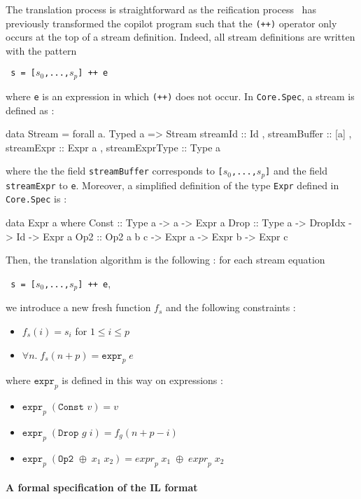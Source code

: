 The translation process is straightforward as the reification process~\cite{} has previously transformed the copilot program such that the \texttt{(++)} operator only occurs at the top of a stream definition. Indeed, all stream definitions are written with the pattern
\begin{center}\texttt{ s = [$s_0$,...,$s_p$] ++ e}\end{center}
where \texttt{e} is an expression in which \texttt{(++)} does not occur. In \texttt{Core.Spec}, a stream is defined as :
\begin{code}
data Stream = forall a. Typed a => Stream
  { streamId         :: Id
  , streamBuffer     :: [a]
  , streamExpr       :: Expr a
  , streamExprType   :: Type a }
\end{code}
where the the field \texttt{streamBuffer} corresponds to \texttt{[$s_0$,...,$s_p$]} and the field \texttt{streamExpr} to \texttt{e}. Moreover, a simplified definition of the type \texttt{Expr} defined in \texttt{Core.Spec} is :
\begin{code}
data Expr a where
  Const  :: Type a -> a -> Expr a
  Drop   :: Type a -> DropIdx -> Id -> Expr a
  Op2    :: Op2 a b c -> Expr a -> Expr b -> Expr c
\end{code}
Then, the translation algorithm is the following : for each stream equation \begin{center}\texttt{ s = [$s_0$,...,$s_p$] ++ e},\end{center}we introduce a new fresh function $f_s$ and the following constraints :

\begin{itemize}
\item $f_s(i) = s_i$ \quad for $1 \leq i \leq p$
\item $\forall n . \; f_s(n + p) = \texttt{expr}_p \; e$
\end{itemize}
where $\texttt{expr}_p$ is defined in this way on expressions :
\begin{itemize}
\item $\texttt{expr}_p \; (\texttt{Const } v) = v$
\item $\texttt{expr}_p \; (\texttt{Drop } g \; i) = f_g(n + p - i)$
\item $\texttt{expr}_p \; (\texttt{Op2 } \oplus \; x_1 \; x_2) =  {expr}_p \; x_1 \; \oplus \; {expr}_p \; x_2 $
\end{itemize}


\paragraph{A formal specification of the IL format} 


